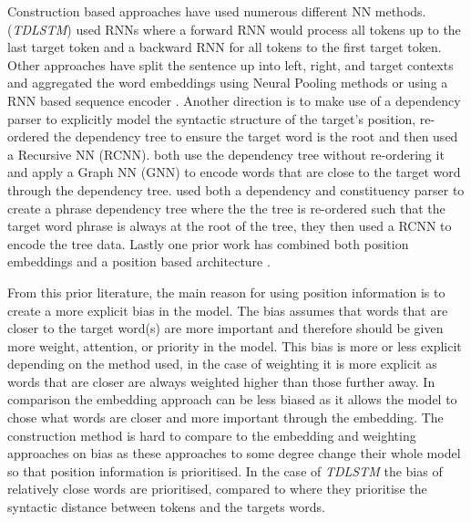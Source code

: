 Construction based approaches have used numerous different NN methods. \citet{tang-etal-2016-effective} (\textit{TDLSTM}) used RNNs where a forward RNN would process all tokens up to the last target token and a backward RNN for all tokens to the first target token. Other approaches have split the sentence up into left, right, and target contexts and aggregated the word embeddings using Neural Pooling methods \citep{vo2015target, zhang2016gated} or using a RNN based sequence encoder \citep{liu-zhang-2017-attention}. Another direction is to make use of a dependency parser to explicitly model the syntactic structure of the target's position, \citet{dong-etal-2014-adaptive} re-ordered the dependency tree to ensure the target word is the root and then used a Recursive NN (RCNN). \citet{sun-etal-2019-aspect, huang-carley-2019-syntax} both use the dependency tree without re-ordering it and apply a Graph NN (GNN) to encode words that are close to the target word through the dependency tree. \citet{nguyen-shirai-2015-phrasernn} used both a dependency and constituency parser to create a phrase dependency tree where the the tree is re-ordered such that the target word phrase is always at the root of the tree, they then used a RCNN to encode the tree data. Lastly one prior work has combined both position embeddings and a position based architecture \citep{sun-etal-2019-aspect}.

From this prior literature, the main reason for using position information is to create a more explicit bias in the model. The bias assumes that words that are closer to the target word(s) are more important and therefore should be given more weight, attention, or priority in the model. This bias is more or less explicit depending on the method used, in the case of weighting it is more explicit as words that are closer are always weighted higher than those further away. In comparison the embedding approach can be less biased as it allows the model to chose what words are closer and more important through the embedding. The construction method is hard to compare to the embedding and weighting approaches on bias as these approaches to some degree change their whole model so that position information is prioritised. In the case of \textit{TDLSTM} \citep{tang-etal-2016-effective} the bias of relatively close words are prioritised, compared to \citet{dong-etal-2014-adaptive} where they prioritise the syntactic distance between tokens and the targets words. 


